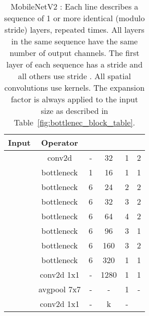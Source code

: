 \documentclass[10pt,twocolumn,letterpaper]{article}
\begin{document}
\begin{table}[t]
\centering
\vspace{0pt}
\begin{tabular}{c|c|c|c|c|c}
\toprule[0.2em]
Input & Operator                           & &  &  &  \\
\toprule[0.2em]
 &    conv2d                  &  - &  32 & 1 & 2\\
 &    bottleneck    &  1 & 16   & 1 & 1 \\
 &   bottleneck     &  6 & 24   & 2 & 2 \\
 &   bottleneck      &  6 & 32   & 3 & 2 \\
 & bottleneck        &  6 & 64   & 4 & 2 \\
 &    bottleneck     &  6 & 96   & 3 & 1 \\
 &    bottleneck     &  6 & 160  & 3 & 2 \\
 &    bottleneck     &  6 & 320  & 1 & 1 \\
 & conv2d 1x1       &  - & 1280 & 1 & 1 \\
  & avgpool 7x7     &  - & -    & 1 & - \\   
 & conv2d 1x1                      &  - & k    & -& \\
\toprule[0.2em]
\end{tabular}


\caption {
    \mbox{MobileNetV2} : Each line describes a sequence of 1 or more identical (modulo stride)  layers, repeated  times.
    All layers in the same sequence have the same number  of output channels.
    The first layer of each sequence has a stride  and all others use stride .
    All spatial convolutions use  kernels. The expansion factor  is always applied to the input size as described in Table~\ref{fig:bottlenec_block_table}.
}
\label{mobilenet:arch}
\end{table}
\end{document}
